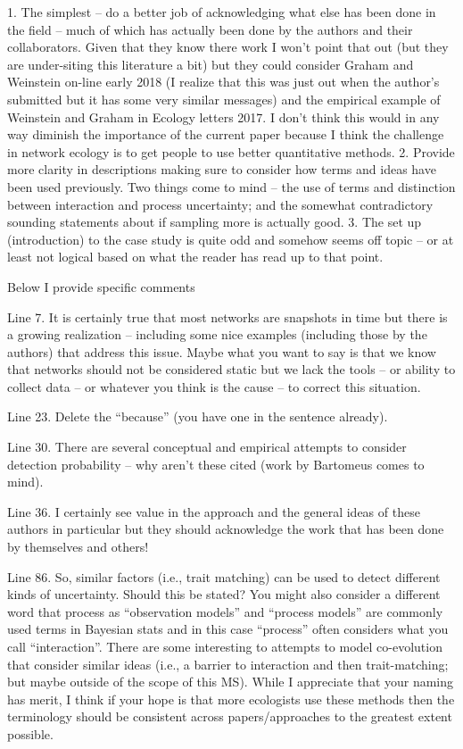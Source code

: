 1.      The simplest – do a better job of acknowledging what else has been done in the field – much of which has actually been done by the authors and their collaborators.  Given that they know there work I won’t point that out (but they are under-siting this literature a bit) but they could consider Graham and Weinstein on-line early 2018 (I realize that this was just out when the author’s submitted but it has some very similar messages) and the empirical example of Weinstein and Graham in Ecology letters 2017.  I don’t think this would in any way diminish the importance of the current paper because I think the challenge in network ecology is to get people to use better quantitative methods.
2.      Provide more clarity in descriptions making sure to consider how terms and ideas have been used previously.  Two things come to mind – the use of terms and distinction between interaction and process uncertainty; and the somewhat contradictory sounding statements about if sampling more is actually good.
3.      The set up (introduction) to the case study is quite odd and somehow seems off topic – or at least not logical based on what the reader has read up to that point.

Below I provide specific comments

Line 7.  It is certainly true that most networks are snapshots in time but there is a growing realization – including some nice examples (including those by the authors) that address this issue.  Maybe what you want to say is that we know that networks should not be considered static but we lack the tools – or ability to collect data – or whatever you think is the cause – to correct this situation. 

Line 23.  Delete the “because” (you have one in the sentence already).

Line 30.  There are several conceptual and empirical attempts to consider detection probability – why aren’t these cited (work by Bartomeus comes to mind).

Line 36.  I certainly see value in the approach and the general ideas of these authors in particular but they should acknowledge the work that has been done by themselves and others!

Line 86.  So, similar factors (i.e., trait matching) can be used to detect different kinds of uncertainty.  Should this be stated?  You might also consider a different word that process as “observation models” and “process models” are commonly used terms in Bayesian stats and in this case “process” often considers what you call “interaction”.  There are some interesting to attempts to model co-evolution that consider similar ideas (i.e., a barrier to interaction and then trait-matching; but maybe outside of the scope of this MS). While I appreciate that your naming has merit, I think if your hope is that more ecologists use these methods then the terminology should be consistent across papers/approaches to the greatest extent possible.

